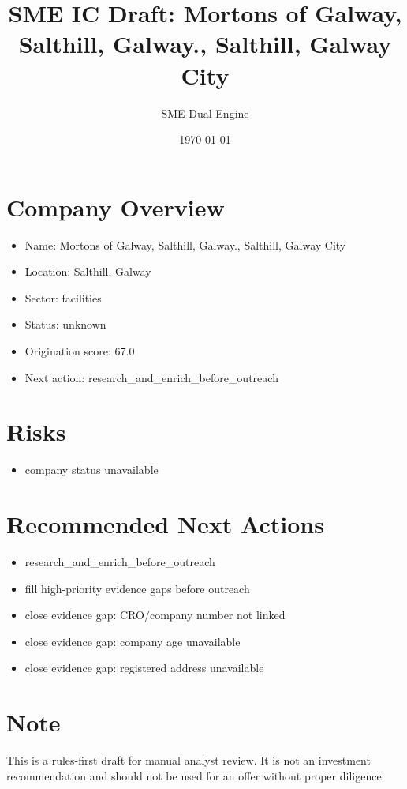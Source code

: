 \documentclass[11pt,a4paper]{article}
\title{SME IC Draft: Mortons of Galway, Salthill, Galway., Salthill, Galway City}
\author{SME Dual Engine}
\date{\today}
\begin{document}
\maketitle
\section*{Company Overview}
\begin{itemize}[leftmargin=1.4em]
\item Name: Mortons of Galway, Salthill, Galway., Salthill, Galway City
\item Location: Salthill, Galway
\item Sector: facilities
\item Status: unknown
\item Origination score: 67.0
\item Next action: research\_and\_enrich\_before\_outreach
\end{itemize}
\section*{Risks}
\begin{itemize}[leftmargin=1.4em]
\item company status unavailable
\end{itemize}
\section*{Recommended Next Actions}
\begin{itemize}[leftmargin=1.4em]
\item research\_and\_enrich\_before\_outreach
\item fill high-priority evidence gaps before outreach
\item close evidence gap: CRO/company number not linked
\item close evidence gap: company age unavailable
\item close evidence gap: registered address unavailable
\end{itemize}
\section*{Note}
This is a rules-first draft for manual analyst review. It is not an investment
recommendation and should not be used for an offer without proper diligence.
\end{document}
